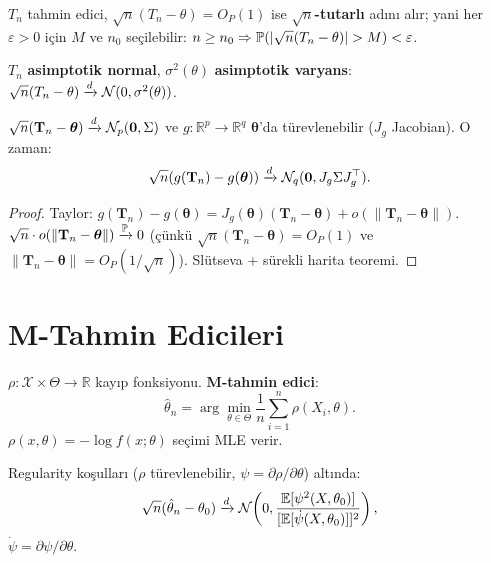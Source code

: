 \begin{tanim}\label{def:sqrtn_tutarli}
$T_n$ tahmin edici, $\sqrt{n}(T_n-\theta) = O_P(1)$ ise \textbf{$\sqrt{n}$-tutarlı} adını alır; yani her $\varepsilon>0$ için $M$ ve $n_0$ seçilebilir: $n\geq n_0 \Rightarrow \Prob(|\sqrt{n}(T_n-\theta)|>M)<\varepsilon$.
\end{tanim}

\begin{tanim}\label{def:asimptotik_normal}
$T_n$ \textbf{asimptotik normal}, $\sigma^2(\theta)$ \textbf{asimptotik varyans}: $\sqrt{n}(T_n-\theta)\xrightarrow{d}\mathcal{N}(0,\sigma^2(\theta))$.
\end{tanim}

\begin{teorem}\label{thm:delta_cok}
$\sqrt{n}(\mathbf{T}_n-\boldsymbol{\theta})\xrightarrow{d}\mathcal{N}_p(\mathbf{0},\Sigma)$ ve $g:\mathbb{R}^p\to\mathbb{R}^q$ $\boldsymbol{\theta}$'da türevlenebilir ($J_g$ Jacobian). O zaman:
\[
  \sqrt{n}(g(\mathbf{T}_n)-g(\boldsymbol{\theta}))\xrightarrow{d}\mathcal{N}_q(\mathbf{0},J_g\Sigma J_g^\top).
\]
\end{teorem}

\begin{proof}
Taylor: $g(\mathbf{T}_n) - g(\boldsymbol{\theta}) = J_g(\boldsymbol{\theta})(\mathbf{T}_n-\boldsymbol{\theta}) + o(\|\mathbf{T}_n-\boldsymbol{\theta}\|)$. $\sqrt{n}\cdot o(\|\mathbf{T}_n-\boldsymbol{\theta}\|)\xrightarrow{\mathbb{P}}0$ (çünkü $\sqrt{n}(\mathbf{T}_n-\boldsymbol{\theta})=O_P(1)$ ve $\|\mathbf{T}_n-\boldsymbol{\theta}\|=O_P(1/\sqrt{n})$). Slütseva + sürekli harita teoremi.
\end{proof}

\section{M-Tahmin Edicileri}
\label{sec:m_tahmin}

\begin{tanim}\label{def:m_tahmin}
$\rho:\mathcal{X}\times\Theta\to\mathbb{R}$ kayıp fonksiyonu. \textbf{M-tahmin edici}:
\[
  \hat\theta_n = \arg\min_{\theta\in\Theta} \frac{1}{n}\sum_{i=1}^n\rho(X_i,\theta).
\]
$\rho(x,\theta)=-\log f(x;\theta)$ seçimi MLE verir.
\end{tanim}

\begin{teorem}\label{thm:m_asimptotik}
Regularity koşulları ($\rho$ türevlenebilir, $\psi=\partial\rho/\partial\theta$) altında:
\[
  \sqrt{n}(\hat\theta_n-\theta_0)\xrightarrow{d}\mathcal{N}\!\left(0, \frac{\mathbb{E}[\psi^2(X,\theta_0)]}{[\mathbb{E}[\dot\psi(X,\theta_0)]]^2}\right),
\]
$\dot\psi = \partial\psi/\partial\theta$.
\end{teorem}

